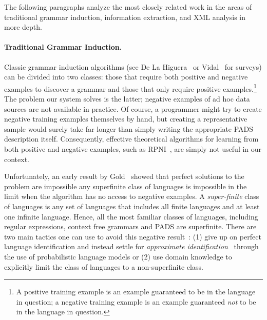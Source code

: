 \noindent
The following paragraphs analyze
the most closely related work in the areas of
traditional grammar induction, information extraction, and XML analysis
in more depth.

\paragraph*{Traditional Grammar Induction.}
Classic grammar induction algorithms (see De La Higuera~\cite{higuera01current}
or Vidal~\cite{vidal:gisurvey} for surveys) can be divided into two classes:
those that require both positive and negative examples to discover a grammar
and those that only require positive examples.\footnote{A positive training
example is an example guaranteed to be in the language in question;
a negative training example is an example guaranteed {\em not} to be in the 
language in question.}  The problem our system solves is the latter; 
negative examples of ad hoc data sources are not available in practice.  
Of course, a programmer might try to create
negative training examples themselves by hand, but creating a representative
sample would surely take far longer than simply writing
the appropriate PADS description itself.  Consequently, effective theoretical
algorithms for learning from both positive and negative examples, such as
RPNI~\cite{rpni}, are simply not useful in our context.  

Unfortunately, an early result by Gold~\cite{gold:inference} 
showed that perfect solutions to the problem
are impossible any superfinite class of languages is 
impossible in the limit when the algorithm has no access to negative 
examples.  A {\em super-finite} class of languages is any set of languages
that includes all finite languages and at least one infinite language. Hence,
all the most familiar classes of languages, including regular expressions, 
context free grammars and PADS are superfinite.  There are two
main tactics one can use to avoid this negative result~\cite{vidal:gisurvey}:
(1) give up on perfect language identification and instead
settle for 
{\em approximate identification}~\cite{wharton:approximate-language-identification} through the use of probabilistic language
models or (2) use domain knowledge to explicitly limit the class of languages
to a non-superfinite class.  

